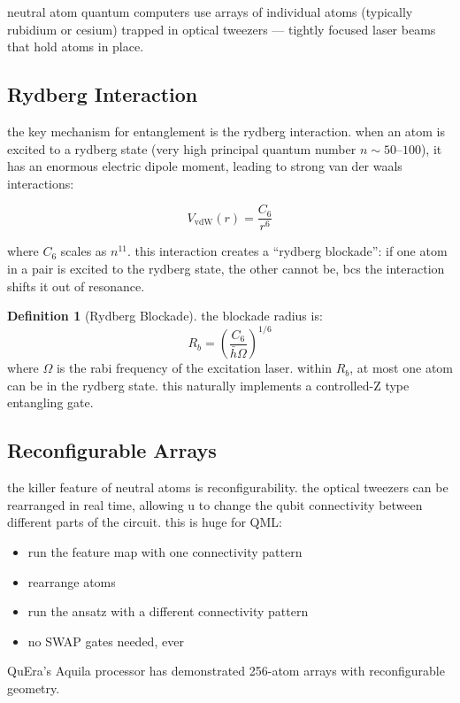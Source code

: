 \documentclass[11pt,a4paper]{article}
\theoremstyle{definition}
\newtheorem{definition}{Definition}[section]
\theoremstyle{remark}
\begin{document}
neutral atom quantum computers use arrays of individual atoms (typically rubidium or cesium) trapped in optical tweezers --- tightly focused laser beams that hold atoms in place.

\subsection{Rydberg Interaction}

the key mechanism for entanglement is the rydberg interaction. when an atom is excited to a rydberg state (very high principal quantum number $n \sim 50$--$100$), it has an enormous electric dipole moment, leading to strong van der waals interactions:

\[
V_{\text{vdW}}(r) = \frac{C_6}{r^6}
\]

where $C_6$ scales as $n^{11}$. this interaction creates a ``rydberg blockade'': if one atom in a pair is excited to the rydberg state, the other cannot be, bcs the interaction shifts it out of resonance.

\begin{definition}[Rydberg Blockade]
the blockade radius is:
\[
R_b = \left(\frac{C_6}{\bar{h} \Omega}\right)^{1/6}
\]
where $\Omega$ is the rabi frequency of the excitation laser. within $R_b$, at most one atom can be in the rydberg state. this naturally implements a controlled-Z type entangling gate.
\end{definition}

\subsection{Reconfigurable Arrays}

the killer feature of neutral atoms is reconfigurability. the optical tweezers can be rearranged in real time, allowing u to change the qubit connectivity between different parts of the circuit. this is huge for QML:
\begin{itemize}[leftmargin=*]
    \item run the feature map with one connectivity pattern
    \item rearrange atoms
    \item run the ansatz with a different connectivity pattern
    \item no SWAP gates needed, ever
\end{itemize}

QuEra's Aquila processor has demonstrated 256-atom arrays with reconfigurable geometry.
\end{document}

